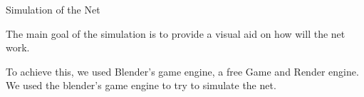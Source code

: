 Simulation of the Net

The main goal of the simulation is to provide a visual aid on how will the net work.

To achieve this, we used Blender's game engine, a free Game and Render engine. We used the blender's game engine to try to simulate the net. 
